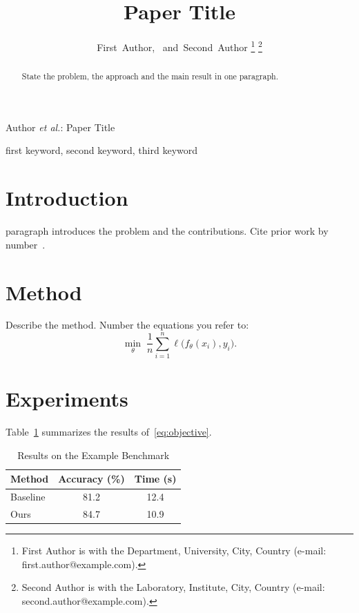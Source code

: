 \documentclass[journal]{IEEEtran}
\begin{document}
\title{Paper Title}

\author{First~Author,~
  and~Second~Author%
\thanks{First Author is with the Department, University, City, Country (e-mail: first.author@example.com).}%
\thanks{Second Author is with the Laboratory, Institute, City, Country (e-mail: second.author@example.com).}}

%
{Author \MakeLowercase{\textit{et al.}}: Paper Title}

\maketitle

\begin{abstract}
State the problem, the approach and the main result in one paragraph.
\end{abstract}

\begin{IEEEkeywords}
first keyword, second keyword, third keyword
\end{IEEEkeywords}

\section{Introduction}
 paragraph introduces the problem and the contributions.
Cite prior work by number~\cite{lamport1994latex,knuth1984texbook}.

\section{Method}
Describe the method. Number the equations you refer to:
\begin{equation}
  \label{eq:objective}
  \min_{\theta} \; \frac{1}{n} \sum_{i=1}^{n} \ell\bigl(f_\theta(x_i), y_i\bigr) .
\end{equation}

\section{Experiments}
Table~\ref{tab:results} summarizes the results of~\eqref{eq:objective}.

\begin{table}[!htb]
  \caption{Results on the Example Benchmark}
  \label{tab:results}
  \centering
  \begin{tabular}{lcc}
    \toprule
    Method   & Accuracy (\%) & Time (s) \\
    \midrule
    Baseline & 81.2          & 12.4     \\
    Ours     & 84.7          & 10.9     \\
    \bottomrule
  \end{tabular}
\end{table}
\end{document}
